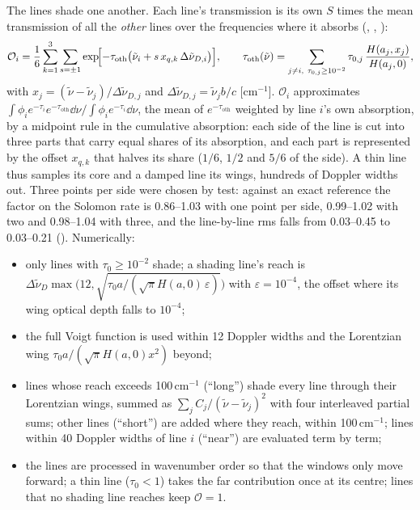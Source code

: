 The \Htwo{} lines shade one another. Each line's transmission is its own $S$
times the mean transmission of all the \emph{other} lines over the frequencies
where it absorbs (, ,
):
\begin{equation}
  \mathcal{O}_i = \frac16\sum_{k=1}^{3}\sum_{s=\pm1}
     \exp\!\Bigl[-\tau_{\mathrm{oth}}\bigl(\tilde\nu_i + s\,x_{q,k}\,\Delta\tilde\nu_{D,i}\bigr)\Bigr],
  \qquad
  \tau_{\mathrm{oth}}(\tilde\nu) = \sum_{j\neq i,\ \tau_{0,j}\ge10^{-2}} \tau_{0,j}\,\frac{H(a_j,x_j)}{H(a_j,0)},
  \label{eq:overlap}
\end{equation}
with $x_j=(\tilde\nu-\tilde\nu_j)/\Delta\tilde\nu_{D,j}$ and
$\Delta\tilde\nu_{D,j}=\tilde\nu_j b/c$ [cm$^{-1}$]. $\mathcal{O}_i$ approximates
$\int\phi_ie^{-\tau_i}e^{-\tau_{\mathrm{oth}}}\dd\nu\big/\int\phi_ie^{-\tau_i}\dd\nu$, the mean of
$e^{-\tau_{\mathrm{oth}}}$ weighted by line $i$'s own absorption, by a midpoint rule in
the cumulative absorption: each side of the line is cut into three parts that
carry equal shares of its absorption, and each part is represented by the
offset $x_{q,k}$ that halves its share ($1/6$, $1/2$ and $5/6$ of the side). A thin
line thus samples its core and a damped line its wings, hundreds of Doppler
widths out. Three points per side were chosen by test: against an exact
reference the factor on the Solomon rate is 0.86--1.03 with one point per side,
0.99--1.02 with two and 0.98--1.04 with three, and the line-by-line rms falls from
0.03--0.45 to 0.03--0.21 (). Numerically:
\begin{itemize}
\item only lines with $\tau_0\ge10^{-2}$ shade; a shading line's reach is
  $\Delta\tilde\nu_D\max\bigl(12,\sqrt{\tau_0 a/(\sqrt\pi H(a,0)\,\varepsilon)}\bigr)$
  with $\varepsilon=10^{-4}$, the offset where its wing optical depth falls
  to $10^{-4}$;
\item the full Voigt function is used within 12 Doppler widths and the
  Lorentzian wing $\tau_0 a/(\sqrt\pi H(a,0)x^2)$ beyond;
\item lines whose reach exceeds 100\,cm$^{-1}$ (``long'') shade every line
  through their Lorentzian wings, summed as $\sum_j C_j/(\tilde\nu-\tilde\nu_j)^2$
  with four interleaved partial sums; other lines (``short'') are added where
  they reach, within 100\,cm$^{-1}$; lines within 40 Doppler widths of line $i$
  (``near'') are evaluated term by term;
\item the lines are processed in wavenumber order so that the windows only
  move forward; a thin line ($\tau_0<1$) takes the far contribution once at
  its centre; lines that no shading line reaches keep $\mathcal{O}=1$.
\end{itemize}
